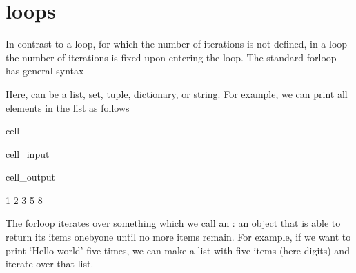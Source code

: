 \documentclass[letterpaper,10pt,english]{jupyterBook}
\begin{document}
\section{ loops}
\label{\detokenize{notebooks/03_ControlStructures/03_ControlStructures_student:for-loops}}
\sphinxAtStartPar
In contrast to a \sphinxhyphen{}loop, for which the number of iterations is not defined, in a \sphinxhyphen{}loop the number of iterations is fixed upon entering the loop. The standard for\sphinxhyphen{}loop has general syntax

\begin{sphinxVerbatim}[commandchars=\\\{\}]
   
      
\end{sphinxVerbatim}

\sphinxAtStartPar
Here,  can be a list, set, tuple, dictionary, or string. For example, we can print all elements in the list \sphinxcode{\sphinxupquote{{[}1, 2, 3, 5, 8{]}}} as follows

\begin{sphinxuseclass}{cell}\begin{sphinxVerbatimInput}

\begin{sphinxuseclass}{cell_input}
\begin{sphinxVerbatim}[commandchars=\\\{\}]
   \PYG{p}{[}    \PYG{p}{]}
\end{sphinxVerbatim}

\end{sphinxuseclass}\end{sphinxVerbatimInput}
\begin{sphinxVerbatimOutput}

\begin{sphinxuseclass}{cell_output}
\begin{sphinxVerbatim}[commandchars=\\\{\}]
1
2
3
5
8
\end{sphinxVerbatim}

\end{sphinxuseclass}\end{sphinxVerbatimOutput}

\end{sphinxuseclass}
\sphinxAtStartPar
The for\sphinxhyphen{}loop iterates over something which we call an : an object that is able to return its items one\sphinxhyphen{}by\sphinxhyphen{}one until no more items remain. For example, if we want to print ‘Hello world’ five times, we can make a list with five items (here digits) and iterate over that list.
\end{document}
